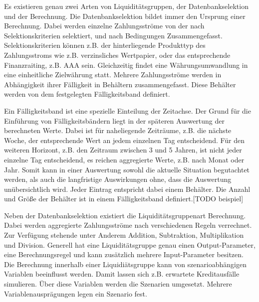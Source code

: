 Es existieren genau zwei Arten von Liquiditätsgruppen, der Datenbankselektion und der Berechnung. Die Datenbankselektion bildet immer den Ursprung einer Berechnung. Dabei werden einzelne Zahlungsströme von der nach Selektionskriterien selektiert, und nach Bedingungen Zusammengefasst. Selektionskriterien können z.B. der hinterliegende Produkttyp des Zahlungsstroms wie z.B. verzinsliches Wertpapier, oder das entsprechende Finanzraiting, z.B. AAA sein. Gleichzeitig findet eine Währungsumwandlung in eine einheitliche Zielwährung statt. Mehrere Zahlungsströme werden in Abhängigkeit ihrer Fälligkeit in Behältern zusammengefasst. Diese Behälter werden von dem festgelegten Fälligkeitsband definiert.

Ein Fälligkeitsband ist eine spezielle Einteilung der Zeitachse. Der Grund für die Einführung von Fälligkeitsbändern liegt in der späteren Auswertung der berechneten Werte. Dabei ist für naheliegende Zeiträume, z.B. die nächste Woche, der entsprechende Wert an jedem einzelnen Tag entscheidend. Für den weiteren Horizont, z.B. den Zeitraum zwischen 3 und 5 Jahren, ist nicht jeder einzelne Tag  entscheidend, es reichen aggregierte Werte, z.B. nach Monat oder Jahr. Somit kann in einer Auswertung sowohl die aktuelle Situation begutachtet werden, als auch die langfristige Auswirkungen ohne, dass die Auswertung unübersichtlich wird. Jeder Eintrag entspricht dabei einem Behälter. Die Anzahl und Größe der Behälter ist in einem Fälligkeitsband definiert.[TODO beispiel]

Neben der Datenbankselektion existiert die Liquiditätsgruppenart Berechnung. Dabei werden aggregierte Zahlungsströme nach verschiedenen Regeln verrechnet. Zur Verfügung stehende unter Anderem Addition, Subtraktion, Multiplikation und Division. Generell hat eine Liquiditätsgruppe genau einen Output-Parameter, eine Berechnungsregel und kann zusätzlich mehrere Input-Parameter besitzen. Die Berechnung innerhalb einer Liquidiätsgruppe kann von szenarioabhängigen Variablen beeinflusst werden. Damit lassen sich z.B. erwartete Kreditausfälle simulieren. Über diese Variablen werden die Szenarien umgesetzt. Mehrere Variablenausprägungen legen ein Szenario fest.

